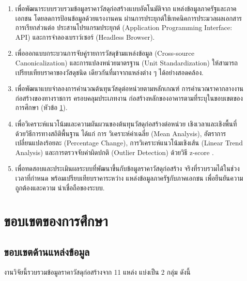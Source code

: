 \begin{enumerate}[leftmargin=2em,itemsep=0.4em]
  \item เพื่อพัฒนาระบบรวบรวมข้อมูลราคาวัสดุก่อสร้างแบบอัตโนมัติจาก
        แหล่งข้อมูลภาครัฐและภาคเอกชน โดยลดการป้อนข้อมูลด้วยแรงงานคน
        ผ่านการประยุกต์ใช้เทคนิคการประมวลผลเอกสาร การเรียกส่วนต่อ
        ประสานโปรแกรมประยุกต์ (Application Programming Interface: API)
        และการจำลองเบราว์เซอร์ (Headless Browser).

  \item เพื่อออกแบบกระบวนการจับคู่รายการวัสดุข้ามแหล่งข้อมูล
        (Cross-source Canonicalization) และการแปลงหน่วยมาตรฐาน
        (Unit Standardization) ให้สามารถเปรียบเทียบราคาของวัสดุชนิด
        เดียวกันที่มาจากแหล่งต่าง ๆ ได้อย่างสอดคล้อง.

  \item เพื่อพัฒนาแบบจำลองการคำนวณต้นทุนวัสดุต่อหน่วยตามหลักเกณฑ์
        การคำนวณราคากลางงานก่อสร้างของทางราชการ ครอบคลุมประเภทงาน
        ก่อสร้างหลักของอาคารตามที่ระบุในขอบเขตของการศึกษา (หัวข้อ
        \ref{sec:scope}).

  \item เพื่อวิเคราะห์แนวโน้มและความผันผวนของต้นทุนวัสดุก่อสร้างต่อหน่วย
        เชิงเวลาและเชิงพื้นที่ ด้วยวิธีการทางสถิติพื้นฐาน ได้แก่ การ
        วิเคราะห์ค่าเฉลี่ย (Mean Analysis), อัตราการเปลี่ยนแปลงร้อยละ
        (Percentage Change), การวิเคราะห์แนวโน้มเชิงเส้น (Linear Trend
        Analysis) และการตรวจจับค่าผิดปกติ (Outlier Detection) ด้วยวิธี
        z-score \cite{lee2024}.

  \item เพื่อทดสอบและประเมินผลระบบที่พัฒนาขึ้นกับข้อมูลราคาวัสดุก่อสร้าง
        จริงที่รวบรวมได้ในช่วงเวลาที่กำหนด พร้อมเปรียบเทียบราคาระหว่าง
        แหล่งข้อมูลภาครัฐกับภาคเอกชน เพื่อยืนยันความถูกต้องและความ
        น่าเชื่อถือของระบบ.
\end{enumerate}

\section{ขอบเขตของการศึกษา}
\label{sec:scope}

\subsection{ขอบเขตด้านแหล่งข้อมูล}

งานวิจัยนี้รวบรวมข้อมูลราคาวัสดุก่อสร้างจาก 11 แหล่ง แบ่งเป็น 2 กลุ่ม
ดังนี้


